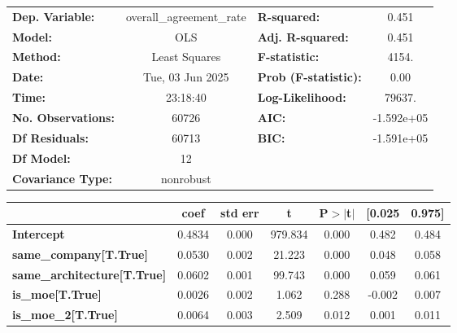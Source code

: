 \begin{center}
\begin{tabular}{lclc}
\toprule
\textbf{Dep. Variable:}             & overall\_agreement\_rate & \textbf{  R-squared:         } &     0.451   \\
\textbf{Model:}                     &           OLS            & \textbf{  Adj. R-squared:    } &     0.451   \\
\textbf{Method:}                    &      Least Squares       & \textbf{  F-statistic:       } &     4154.   \\
\textbf{Date:}                      &     Tue, 03 Jun 2025     & \textbf{  Prob (F-statistic):} &     0.00    \\
\textbf{Time:}                      &         23:18:40         & \textbf{  Log-Likelihood:    } &    79637.   \\
\textbf{No. Observations:}          &           60726          & \textbf{  AIC:               } & -1.592e+05  \\
\textbf{Df Residuals:}              &           60713          & \textbf{  BIC:               } & -1.591e+05  \\
\textbf{Df Model:}                  &              12          & \textbf{                     } &             \\
\textbf{Covariance Type:}           &        nonrobust         & \textbf{                     } &             \\
\bottomrule
\end{tabular}
\begin{tabular}{lcccccc}
                                    & \textbf{coef} & \textbf{std err} & \textbf{t} & \textbf{P$> |$t$|$} & \textbf{[0.025} & \textbf{0.975]}  \\
\midrule
\textbf{Intercept}                  &       0.4834  &        0.000     &   979.834  &         0.000        &        0.482    &        0.484     \\
\textbf{same\_company[T.True]}      &       0.0530  &        0.002     &    21.223  &         0.000        &        0.048    &        0.058     \\
\textbf{same\_architecture[T.True]} &       0.0602  &        0.001     &    99.743  &         0.000        &        0.059    &        0.061     \\
\textbf{is\_moe[T.True]}            &       0.0026  &        0.002     &     1.062  &         0.288        &       -0.002    &        0.007     \\
\textbf{is\_moe\_2[T.True]}         &       0.0064  &        0.003     &     2.509  &         0.012        &        0.001    &        0.011     \\

\end{tabular}
\end{center}
